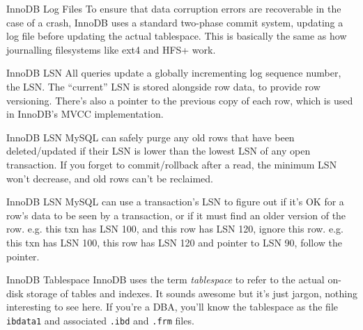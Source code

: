 \documentclass[14pt]{beamer}
\begin{document}
\begin{frame}{InnoDB Log Files}
  To ensure that data corruption errors are recoverable in the case of a crash,
  InnoDB uses a standard two-phase commit system, updating a log file before
  updating the actual tablespace.
  \newline
  \newline
  This is basically the same as how journalling filesystems like ext4 and HFS+ work.
\end{frame}

\begin{frame}{InnoDB LSN}
  All queries update a globally incrementing log sequence number, the LSN. The
  ``current'' LSN is stored alongside row data, to provide row versioning.
  \newline
  \newline
  There's also a pointer to the previous copy of each row, which is used in
  InnoDB's MVCC implementation.
\end{frame}

\begin{frame}{InnoDB LSN}
  MySQL can safely purge any old rows that have been deleted/updated if their
  LSN is lower than the lowest LSN of any open transaction.
  \newline
  \newline
  If you forget to commit/rollback after a read, the minimum LSN won't decrease,
  and old rows can't be reclaimed.
\end{frame}

\begin{frame}{InnoDB LSN}
  MySQL can use a transaction's LSN to figure out if it's OK for a row's data to
  be seen by a transaction, or if it must find an older version of the
  row.
  \pause
  \newline
  \newline
  e.g. this txn has LSN 100, and this row has LSN 120, ignore this row.
  \pause
  \newline
  \newline
  e.g. this txn has LSN 100, this row has LSN 120 and pointer to LSN 90, follow
  the pointer.
\end{frame}

\begin{frame}{InnoDB Tablespace}
  InnoDB uses the term \emph{tablespace} to refer to the actual on-disk storage
  of tables and indexes. It sounds awesome but it's just jargon, nothing
  interesting to see here.
  \newline
  \newline
  If you're a DBA, you'll know the tablespace as the file \texttt{ibdata1} and
  associated \texttt{.ibd} and \texttt{.frm} files.
\end{frame}
\end{document}
